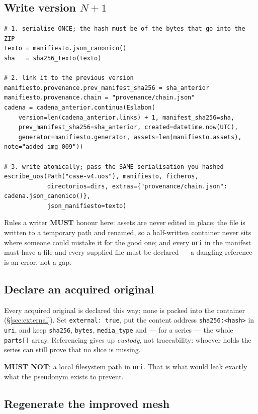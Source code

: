 \documentclass[11pt,a4paper]{article}
\newcommand{\MUST}{\textcolor{uosred}{\textbf{MUST}}}
\newcommand{\MUSTNOT}{\textcolor{uosred}{\textbf{MUST NOT}}}
\newcommand{\code}[1]{\texttt{\small #1}}
\begin{document}
\subsection{Write version $N{+}1$}\label{rec:version}

\begin{lstlisting}[style=py]
# 1. serialise ONCE; the hash must be of the bytes that go into the ZIP
texto = manifiesto.json_canonico()
sha   = sha256_texto(texto)

# 2. link it to the previous version
manifiesto.provenance.prev_manifest_sha256 = sha_anterior
manifiesto.provenance.chain = "provenance/chain.json"
cadena = cadena_anterior.continua(Eslabon(
    version=len(cadena_anterior.links) + 1, manifest_sha256=sha,
    prev_manifest_sha256=sha_anterior, created=datetime.now(UTC),
    generator=manifiesto.generator, assets=len(manifiesto.assets), note="added img_009"))

# 3. write atomically; pass the SAME serialisation you hashed
escribe_uos(Path("case-v4.uos"), manifiesto, ficheros,
            directorios=dirs, extras={"provenance/chain.json": cadena.json_canonico()},
            json_manifiesto=texto)
\end{lstlisting}

Rules a writer \MUST{} honour here: assets are never edited in place; the file is written
to a temporary path and renamed, so a half-written container never sits where someone could
mistake it for the good one; and every \code{uri} in the manifest must have a file and
every supplied file must be declared --- a dangling reference is an error, not a gap.

\subsection{Declare an acquired original}\label{rec:external}

Every acquired original is declared this way; none is packed into the container
(\S\ref{sec:external}). Set \code{external: true}, put the content address
\code{sha256:<hash>} in \code{uri}, and keep \code{sha256}, \code{bytes},
\code{media\_type} and --- for a series --- the whole \code{parts[]} array. Referencing
gives up \emph{custody}, not traceability: whoever holds the series can still prove that
no slice is missing.

\MUSTNOT: a local filesystem path in \code{uri}. That is what would leak exactly what the
pseudonym exists to prevent.

\subsection{Regenerate the improved mesh}\label{rec:reversible}
\end{document}
